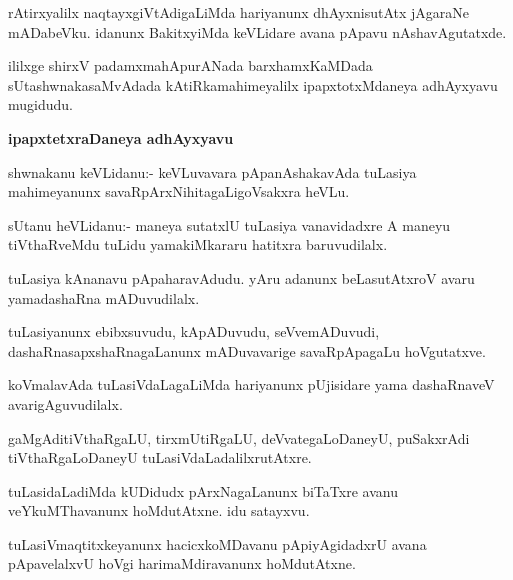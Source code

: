 \begin{mng}
rAtirxyalilx naqtayxgiVtAdigaLiMda hariyanunx dhAyxnisutAtx jAgaraNe mADabeVku. idanunx BakitxyiMda keVLidare avana pApavu nAshavAgutatxde.
\end{mng}
ililxge shirxV padamxmahApurANada barxhamxKaMDada sUtashwnakasaMvAdada kAtiRkamahimeyalilx ipapxtotxMdaneya adhAyxyavu mugidudu.

\begin{center}
\textbf{\large ipapxtetxraDaneya adhAyxyavu}
\end{center}

\begin{mng}
shwnakanu keVLidanu:- keVLuvavara pApanAshakavAda tuLasiya mahimeyanunx savaRpArxNihitagaLigoVsakxra heVLu.
\end{mng}

\begin{mng}
sUtanu heVLidanu:- maneya sutatxlU tuLasiya vanavidadxre A maneyu tiVthaRveMdu tuLidu yamakiMkararu hatitxra baruvudilalx.
\end{mng}

\begin{mng}
tuLasiya kAnanavu pApaharavAdudu. yAru adanunx beLasutAtxroV avaru yamadashaRna mADuvudilalx.
\end{mng}

\begin{mng}
tuLasiyanunx ebibxsuvudu, kApADuvudu, seVvemADuvudi, dashaRnasapxshaRnagaLanunx mADuvavarige savaRpApagaLu hoVgutatxve.
\end{mng}

\begin{mng}
koVmalavAda tuLasiVdaLagaLiMda hariyanunx pUjisidare yama dashaRnaveV avarigAguvudilalx.
\end{mng}

\begin{mng}
gaMgAditiVthaRgaLU, tirxmUtiRgaLU, deVvategaLoDaneyU, puSakxrAdi tiVthaRgaLoDaneyU tuLasiVdaLadalilxrutAtxre.
\end{mng}

\begin{mng}
tuLasidaLadiMda kUDidudx pArxNagaLanunx biTaTxre avanu veYkuMThavanunx hoMdutAtxne. idu satayxvu.
\end{mng}

\begin{mng}
tuLasiVmaqtitxkeyanunx hacicxkoMDavanu pApiyAgidadxrU avana pApavelalxvU hoVgi harimaMdiravanunx hoMdutAtxne.
\end{mng}

